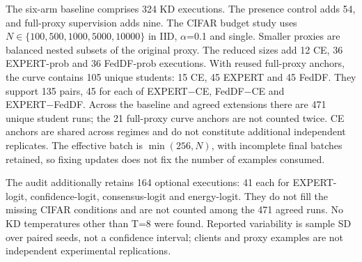 The six-arm baseline comprises 324 KD executions. The presence control adds 54, and full-proxy supervision adds nine. The CIFAR budget study uses \(N\in\{100,500,1000,5000,10000\}\) in IID, \(\alpha\)=0.1 and single. Smaller proxies are balanced nested subsets of the original proxy. The reduced sizes add 12 CE, 36 EXPERT-prob and 36 FedDF-prob executions. With reused full-proxy anchors, the curve contains 105 unique students: 15 CE, 45 EXPERT and 45 FedDF. They support 135 pairs, 45 for each of EXPERT−CE, FedDF−CE and EXPERT−FedDF. Across the baseline and agreed extensions there are 471 unique student runs; the 21 full-proxy curve anchors are not counted twice. CE anchors are shared across regimes and do not constitute additional independent replicates. The effective batch is \(\min(256,N)\), with incomplete final batches retained, so fixing updates does not fix the number of examples consumed.

The audit additionally retains 164 optional executions: 41 each for EXPERT-logit, confidence-logit, consensus-logit and energy-logit. They do not fill the missing CIFAR conditions and are not counted among the 471 agreed runs. No KD temperatures other than T=8 were found. Reported variability is sample SD over paired seeds, not a confidence interval; clients and proxy examples are not independent experimental replications.

